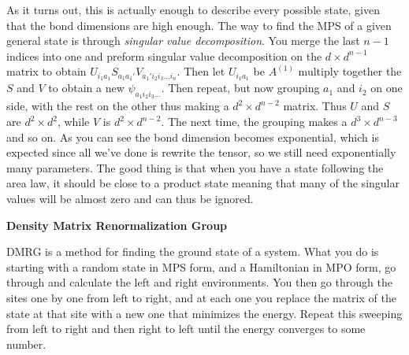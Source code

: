 \documentclass[10pt,landscape]{article}
\newcommand{\topiccolor}{green}
\newcommand{\topic}[2]{%
	\renewcommand{\topiccolor}{#1}
	\begin{tcolorbox}[boxsep=0.5mm, left=1mm, right=1mm, top=0mm, bottom=0mm,
		colback=#1!30, colframe=#1, arc is angular]%
		\centering \textbf{#2}%
	\end{tcolorbox}%
}
\begin{document}
\begin{multicols*}{3}
\begin{center}
\end{center}

As it turns out, this is actually enough to describe every possible state,
given that the bond dimensions are high enough.
The way to find the MPS of a given general state is through \emph{singular value
decomposition}.
You merge the last $n-1$ indices into one and preform singular value
decomposition on the $d\times d^{n-1}$ matrix to obtain
$U_{i_1 a_1} S_{a_1 a_1'} V_{a_1'i_2i_3\ldots i_n}$.
Then let $U_{i_1 a_1}$ be $A^{(1)}$ multiply together the $S$ and $V$ to obtain
a new $\psi_{a_1 i_2 i_3\ldots}$.
Then repeat, but now grouping $a_1$ and $i_2$ on one side, with the rest on the
other thus making a $d^2 \times d^{n-2}$ matrix.
Thus $U$ and $S$ are $d^2 \times d^2$, while $V$ is $d^2 \times d^{n-2}$.
The next time, the grouping makes a $d^3 \times d^{n-3}$ and so on.
As you can see the bond dimension becomes exponential, which is expected since
all we've done is rewrite the tensor, so we still need exponentially many
parameters.
The good thing is that when you have a state following the area law, it should
be close to a product state meaning that many of the singular values will be
almost zero and can thus be ignored.

\topic{cyan}{Density Matrix Renormalization Group}

DMRG is a method for finding the ground state of a system.
What you do is starting with a random state in MPS form, and a Hamiltonian in
MPO form, go through and calculate the left and right environments.
You then go through the sites one by one from left to right, and at each one you
replace the matrix of the state at that site with a new one that minimizes the
energy.
Repeat this sweeping from left to right and then right to left until the energy
converges to some number.


\end{multicols*}
\end{document}
